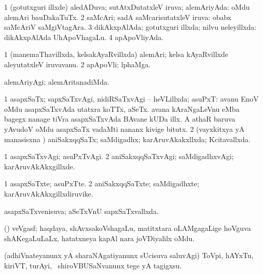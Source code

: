 \bentry
{} 
\gl{\gu}
\expl{}
\bmng
\bnum
\num{1} (gotutxguri illxde) aledADuva; sutAtxDutatxleV iruva; alemAriyAda:  oMdu alemAri bauDakaTuTx. 
\num{2} saMcAri; sadA saMcarisutatxleV iruva:  obabx saMcAriV saMgiVtagAra. 
\num{3} dikAkxpAlAda; gotutxguri illxda; nilvu neleyillxda:  dikAkxpAlAda UhApoVhagaLu. 
\num{4} apApoVliyAda. 
\enum
\emng
\eentry

\bentry
{} 
\gl{\nA}
\expl{}
\bmng
\bnum
\num{1} (manemaThavillxda, kelsakAyaRvillxda) alemAri; kelsa kAyaRvillxde aleyutatxleV iruvavanu. 
\num{2} apApoVli; lphaMga. 
\enum
\emng
\eentry

\bentry
{} 
\gl{\kirxvi}
\expl{}
\bmng
 alemAriyAgi; alemAritanadiMda. 
\emng
\eentry

\bentry
{} 
\gl{\gu}
\expl{}
\bmng
\bnum
\num{1} asapxSaTx; sapxSaTxvAgi, nidiRSaTxvAgi -- heVLillxda; asuPxT:  avanu EnoV oMdu asapxSaTxvAda utatxra koTTx, aSeTx.  avana kAraNgaLeVnu eMba bagegx nanage tiVra asapxSaTxvAda BAvane kUDa illx.  A athaR baruva yAvudoV oMdu asapxSaTx vadaMti nananx kivige bitutx. 
\num{2} (vayxkitxya yA manasisxna \vi) aniSakxqqSaTx; saMdigadhx; karAruvAkakxllxda; Kcitavallxda. 
\enum
\emng
\eentry

\bentry
{} 
\gl{\kirxvi}
\expl{}
\bmng
\bnum
\num{1} asapxSaTxvAgi; asuPxTvAgi. 
\num{2} aniSakxqqSaTxvAgi; saMdigadhxvAgi; karAruvAkAkxgillxde. 
\enum
\emng
\eentry

\bentry
{} 
\gl{\nA}
\expl{}
\bmng
\bnum
\num{1} asapxSaTxte; asuPxTte. 
\num{2} aniSakxqqSaTxte; saMdigadhxte; karAruvAkAkxgillxdiruvike. 
\enum
\emng
\eentry

\bentry
{} 
\gl{\gu}
\expl{}
\bmng
 asapxSaTxvenisuva; aSeTxVnU sapxSaTxvallxda. 
\emng
\eentry

\bentry
{} 
\gl{\nA}
\bmng
 (\aMrashA) veVgasf; haqdaya, shAvxsakoVshagaLu, matitxtara oLAMgagaLige hoVguva shAKegaLuLaLx, hatatxneya kapAl nara joVDiyalilx oMdu. 
\emng
\eentry

\bentry
{} 
\gl{\sakirx}
\expl{}
\bmng
 (adhiVnateyanunx yA sharaNAgatiyanunx sUcisuva saluvAgi) ToVpi, hAYxTu, kiriVT, turAyi, \mo\ shiroVBUSaNvanunx tege yA tagigxsu. 
\emng

